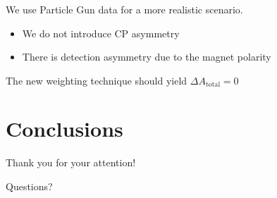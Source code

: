 \documentclass{beamer}
\begin{document}
\begin{frame}
      \frametitle{\insertsubsectionhead}
      \rightarrow We use Particle Gun data for a more realistic scenario.
      \begin{itemize}
            \item We do not introduce CP asymmetry
            \item There is detection asymmetry due to the magnet polarity
      \end{itemize}
      \begin{figure}
            \centering
      \end{figure}
      \rightarrow The new weighting technique should yield $\Delta A_\text{total} = 0$
\end{frame}

\section{Conclusions}

\begin{frame}
      \LARGE
      \centering
      Thank you for your attention!

      Questions?
\end{frame}
\end{document}
